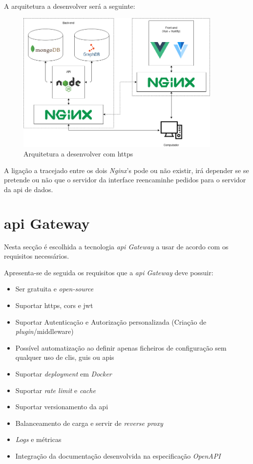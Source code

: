 A arquitetura a desenvolver será a seguinte:
\begin{figure}[H]
    \centering
    \includegraphics[width=0.9\textwidth]{img/apiHttpsArch.png}
    \caption{Arquitetura a desenvolver com \acrshort{https}}
\end{figure}

A ligação a tracejado entre os dois \textit{Nginx}'s pode ou não existir, irá depender se se pretende ou não que o servidor da interface reencaminhe pedidos para o servidor da \acrshort{api} de dados.

\section{\acrshort{api} Gateway}

Nesta secção é escolhida a tecnologia \textit{\acrshort{api} Gateway} a usar de acordo com os requisitos necessários.

Apresenta-se de seguida os requisitos que a \textit{\acrshort{api} Gateway} deve possuir:
\begin{itemize}
    \item Ser gratuita e \textit{open-source}
    \item Suportar \acrshort{https}, \acrshort{cors} e \acrshort{jwt}
    \item Suportar Autenticação e Autorização personalizada (Criação de \textit{plugin}/middleware)
    \item Possível automatização ao definir apenas ficheiros de configuração sem qualquer uso de \acrshort{cli}s, \acrshort{gui}s ou \acrshort{api}s
    \item Suportar \textit{deployment} em \textit{Docker}
    \item Suportar \textit{rate limit} e \textit{cache}
    \item Suportar versionamento da \acrshort{api}
    \item Balanceamento de carga e servir de \textit{reverse proxy}
    \item \textit{Logs} e métricas
    \item Integração da documentação desenvolvida na especificação \textit{OpenAPI}
\end{itemize}

